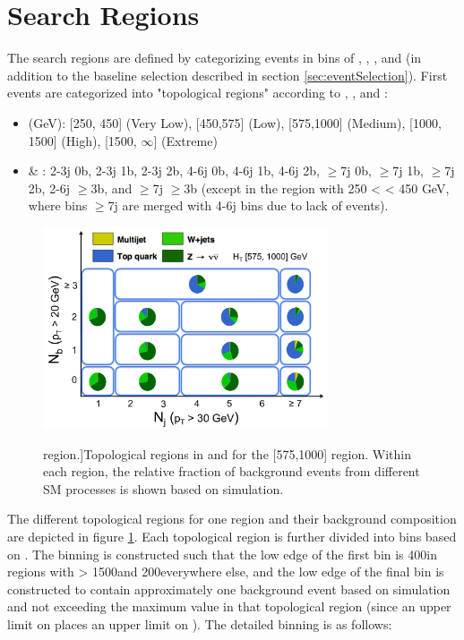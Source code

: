 \section{Search Regions}
\label{sec:searchRegions}
The search regions are defined by categorizing events in bins of \HT, \nj, \nb, and \mttwo (in addition to the baseline selection described in section \ref{sec:eventSelection}). First events are categorized into "topological regions" according to \HT, \nj, and \nb:
\begin{itemize}
	\item \HT (GeV): [250, 450] (Very Low), [450,575] (Low), [575,1000] (Medium), [1000, 1500] (High), [1500, $\infty$] (Extreme)
	\item \nj \& \nb: 2-3j 0b, 2-3j 1b, 2-3j 2b, 4-6j 0b, 4-6j 1b, 4-6j 2b, $\geq$7j 0b, $\geq$7j 1b, $\geq$7j 2b, 2-6j $\geq$3b, and $\geq$7j $\geq$3b (except in the region with 250 < \HT < 450 GeV, where bins $\geq$7j are merged with 4-6j bins due to lack of events).
\end{itemize}
\begin{figure}
	\centering
	\includegraphics[width=0.75\textwidth]{analysis/figs/bkgComposition_HTlabel}
	\renewcommand{\baselinestretch}{1.0}
	\caption[Topological regions in \nj and \nb for the [575,1000] \HT region.]{Topological regions in \nj and \nb for the [575,1000] \HT region. Within each region, the relative fraction of background events from different SM processes is shown based on simulation.}
	\label{fig:topologicalRegions}
\end{figure}
The different topological regions for one \HT region and their background composition are depicted in figure \ref{fig:topologicalRegions}. Each topological region is further divided into bins based on \mttwo. The \mttwo binning is constructed such that the low edge of the first bin is 400\GeV in regions with \HT > 1500\GeV and 200\GeV everywhere else, and the low edge of the final bin is constructed to contain approximately one background event based on simulation and not exceeding the maximum \HT value in that topological region (since an upper limit on \HT places an upper limit on \mttwo). The detailed \mttwo binning is as follows:
